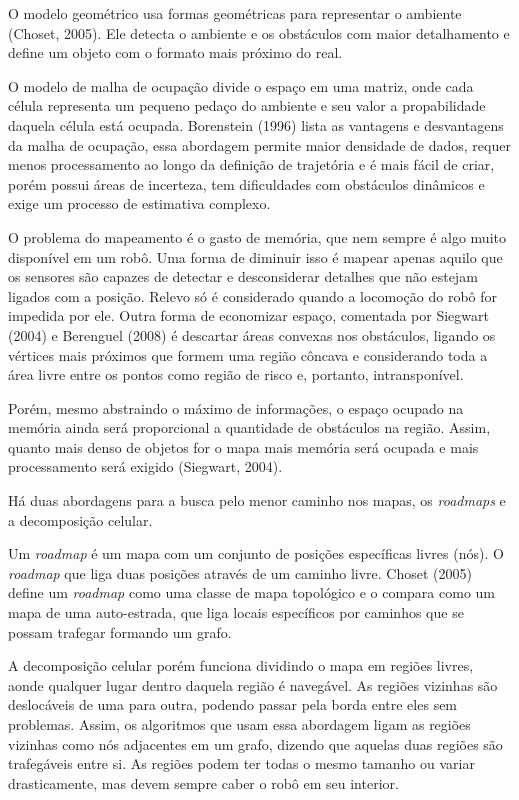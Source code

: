 O modelo geométrico usa formas geométricas para representar o ambiente (Choset, 2005). Ele detecta o ambiente e os obstáculos com maior detalhamento e define um objeto com o formato mais próximo do real. 

O modelo de malha de ocupação divide o espaço em uma matriz, onde cada célula representa um pequeno pedaço do ambiente e seu valor a propabilidade daquela célula está ocupada. Borenstein (1996) lista as vantagens e desvantagens da malha de ocupação, essa abordagem permite maior densidade de dados, requer menos processamento ao longo da definição de trajetória e é mais fácil de criar, porém possui áreas de incerteza, tem dificuldades com obstáculos dinâmicos e exige um processo de estimativa complexo.

O problema do mapeamento é o gasto de memória, que nem sempre é algo muito disponível em um robô. Uma forma de diminuir isso é mapear apenas aquilo que os sensores são capazes de detectar e desconsiderar detalhes que não estejam ligados com a posição. Relevo só é considerado quando a locomoção do robô for impedida por ele. Outra forma de economizar espaço, comentada por Siegwart (2004) e Berenguel (2008) é descartar áreas convexas nos obstáculos, ligando os vértices mais próximos que formem uma região côncava e considerando toda a área livre entre os pontos como região de risco e, portanto, intransponível.

Porém, mesmo abstraindo o máximo de informações, o espaço ocupado na memória ainda será proporcional a quantidade de obstáculos na região. Assim, quanto mais denso de objetos for o mapa mais memória será ocupada e mais processamento será exigido (Siegwart, 2004).

Há duas abordagens para a busca pelo menor caminho nos mapas, os \textit{roadmaps} e a decomposição celular.

Um \textit{roadmap} é um mapa com um conjunto de posições específicas livres (nós). O \textit{roadmap} que liga duas posições através de um caminho livre. Choset (2005) define um \textit{roadmap} como uma classe de mapa topológico e o compara como um mapa de uma auto-estrada, que liga locais específicos por caminhos que se possam trafegar formando um grafo.

A decomposição celular porém funciona dividindo o mapa em regiões livres, aonde qualquer lugar dentro daquela região é navegável. As regiões vizinhas são deslocáveis de uma para outra, podendo passar pela borda entre eles sem problemas. Assim, os algoritmos que usam essa abordagem ligam as regiões vizinhas como nós adjacentes em um grafo, dizendo que aquelas duas regiões são trafegáveis entre si. As regiões podem ter todas o mesmo tamanho ou variar drasticamente, mas devem sempre caber o robô em seu interior.

